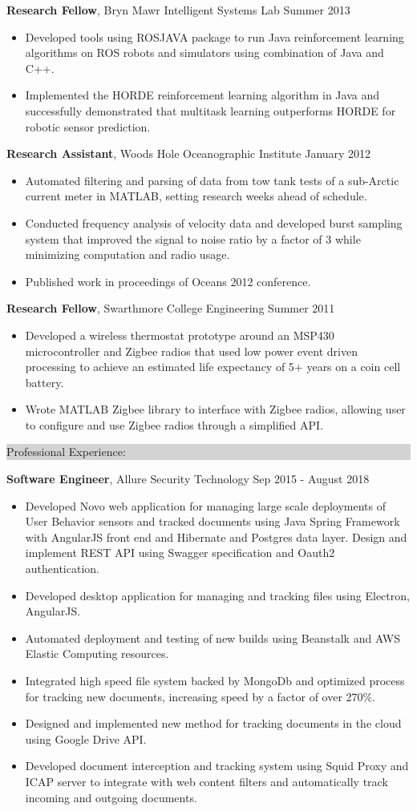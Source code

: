 \documentclass{article} %
\newcommand{\rsection}[1]{
\hspace{-0.4cm}
\colorbox{lightgrey}{
\begin{minipage}{1.07\linewidth}
\vspace{0.25cm}
\fontsize{14pt}{16pt}\selectfont #1 
\vspace{0.15cm}
\end{minipage}
}
\vspace*{-0.2cm}
}
\newcommand{\rjob}[2]{
\vspace{0.1cm}
\hspace*{-0.3cm}  
{\fontsize{10pt}{12pt}\selectfont #1} \hfill #2 
\vspace*{0.1cm} 
\hspace*{-1.2cm}
}
\newenvironment{ritemize}{
\hspace*{-0.8cm} 
\begin{minipage}{1.05\linewidth}
\begin{itemize}
}{
\end{itemize}
\end{minipage}
\vspace{-0.2cm}
}
\newcommand{\ritem}{
\item[-]
}
\begin{document}
\rjob{\textbf{Research Fellow}, Bryn Mawr Intelligent Systems Lab}{Summer 2013}\\
\begin{ritemize}
\ritem Developed tools using ROSJAVA package to run Java reinforcement learning algorithms on ROS robots and simulators using combination of Java and C++.
\ritem Implemented the HORDE reinforcement learning algorithm in Java and successfully demonstrated that multitask learning outperforms HORDE for robotic sensor prediction.
\end{ritemize}

\pagebreak{}

\rjob{\textbf{Research Assistant}, Woods Hole Oceanographic Institute}{January 2012}\\
\begin{ritemize}
\ritem Automated filtering and parsing of data from tow tank tests of a sub-Arctic current meter in MATLAB, setting research weeks ahead of schedule.
\ritem Conducted frequency analysis of velocity data and developed burst sampling system that improved the signal to noise ratio by a factor of 3 while minimizing computation and radio usage. 
\ritem Published work in proceedings of Oceans 2012 conference.
\end{ritemize}

\rjob{\textbf{Research Fellow}, Swarthmore College Engineering}{Summer 2011}\\
\begin{ritemize}
\ritem Developed a wireless thermostat prototype around an MSP430 microcontroller and Zigbee radios that used low power event driven processing to achieve an estimated life expectancy of 5+ years on a coin cell battery.
\ritem Wrote MATLAB Zigbee library to interface with Zigbee radios, allowing user to configure and use Zigbee radios through a simplified API.
\end{ritemize}

\rsection{Professional Experience:}

\rjob{\textbf{Software Engineer}, Allure Security Technology}{Sep 2015 - August 2018}\\
\begin{ritemize}
\ritem Developed Novo web application for managing large scale deployments of User Behavior sensors and tracked documents using Java Spring Framework with AngularJS front end and Hibernate and Postgres data layer. Design and implement REST API using Swagger specification and Oauth2 authentication. 
\ritem Developed desktop application for managing and tracking files using Electron, AngularJS.
\ritem Automated deployment and testing of new builds using Beanstalk and AWS Elastic Computing resources.
\ritem Integrated high speed file system backed by MongoDb and optimized process for tracking new documents, increasing speed by a factor of over 270\%.
\ritem Designed and implemented new method for tracking documents in the cloud using Google Drive API.
\ritem Developed document interception and tracking system using Squid Proxy and ICAP server to integrate with web content filters and automatically track incoming and outgoing documents.
\end{ritemize}
\end{document}
